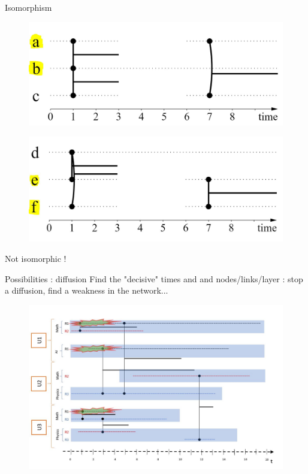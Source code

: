 \documentclass[15pt]{beamer}
\begin{document}
\begin{frame}{Isomorphism}
    \begin{minipage}{0.4\linewidth}
		\begin{figure}
			\centering
			\includegraphics[width=\linewidth]{img/iso1multi.jpg}
			\label{influ}
		\end{figure}
	\end{minipage}
	\begin{minipage}{0.4\linewidth}
		\begin{figure}
			\centering
			\includegraphics[width=\linewidth]{img/iso2multi.jpg}
			\label{influ}
		\end{figure}
	\end{minipage}
		\pause
		
	Not isomorphic !
\end{frame}
\begin{frame}{Possibilities : diffusion} %
Find the "decisive" times and and nodes/links/layer : stop a diffusion, find a weakness in the network...

\begin{figure}
	\centering
    \includegraphics[width=\linewidth]{img/epidemiet0.jpg}
    \label{fig:chercheurs}	
\end{figure}
\end{frame}
\end{document}
